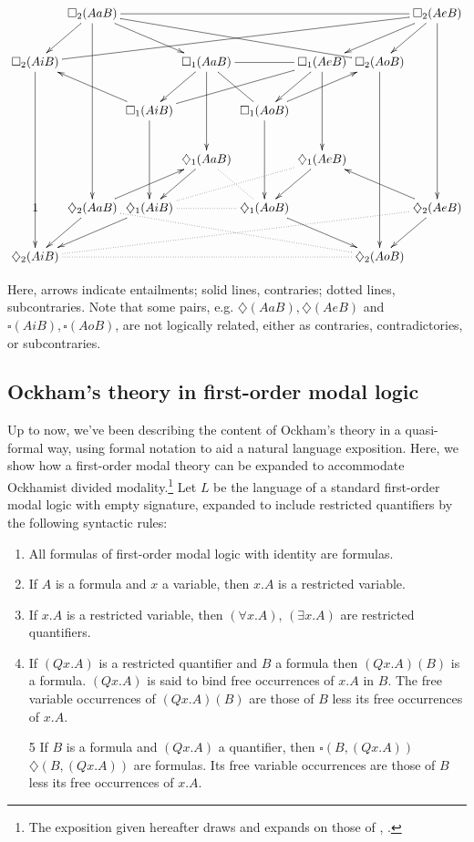 	\begin{displaymath}
	\xymatrix@C=.1em{
		& \square_{2}(AaB) \ar[dddd] \ar[drr] \ar [dl] \ar@{-}[rrrrrr] \ar@{-}[drrrrr] &  &  &  &  &  & \square_{2}(AeB) \ar[dddd] \ar[dl] \ar[dll]\\
		\square_{2}(AiB) \ar[dddd] \ar@{-}[urrrrrrr] &  &  & \square_{1}(AaB) \ar[dd] \ar[dl] \ar@{-}[rr] \ar@{-}[dr]
		&  & \square_{1}(AeB) \ar[dd] \ar[dl] \ar@{-}[dlll] & \square_{2}(AoB) \ar[dddd] &  \\
		&  & \square_{1}(AiB) \ar[dd] \ar[ull] &  & \square_{1}(AoB) \ar[dd] \ar[urr] &  &  &  \\
		&  &  & \diamondsuit_{1}(AaB) \ar[dl] \ar@{.}[dr] &  & \diamondsuit_{1}(AeB) \ar[dl] &  &  \\ 
		1 & \diamondsuit_{2}(AaB) \ar[dl] \ar[urr] \ar@{.}[drrrrr] & \diamondsuit_{1}(AiB) \ar[dll] \ar@{.}[rr] \ar@{.}[rrru]& & \diamondsuit_{1}(AoB) \ar[drr] &  &  & \diamondsuit_{2}(AeB) \ar[ull] \ar[dl] \\
		\diamondsuit_{2}(AiB) \ar@{.}[rrrrrr] \ar@{.}[rrrrrrru] &  &  &  &  &  & \diamondsuit_{2}(AoB) & }
	\end{displaymath}
	
	Here, arrows indicate entailments; solid lines, contraries; dotted lines, subcontraries. Note that some pairs, e.g. $\diamondsuit(AaB), \diamondsuit(AeB)$ and $\square(AiB), \square(AoB)$, are not logically related, either as contraries, contradictories, or subcontraries.
	\subsection{Ockham's theory in first-order modal logic}
	Up to now, we've been describing the content of Ockham's theory in a quasi-formal way, using formal notation to aid a natural language exposition. Here, we show how a first-order modal theory can be expanded to accommodate Ockhamist divided modality.\footnote{The exposition given hereafter draws and expands on those of \cite{Klima1988}, \cite{Klima2001}.} Let $L$ be the language of a standard first-order modal logic with empty signature, expanded to include restricted quantifiers by the following syntactic rules: 
	\begin{enumerate}
		\item All formulas of first-order modal logic with identity are formulas.
		\item If $A$ is a formula and $x$ a variable, then $x.A$ is a restricted variable. 
		\item If $x.A$ is a restricted variable, then $(\forall x.A)$, $(\exists x.A)$ are restricted quantifiers. 
		\item If $(Qx.A)$ is a restricted quantifier and $B$ a formula then $(Qx.A)(B)$ is a formula. $(Qx.A)$ is said to bind free occurrences of $x.A$ in $B$. The free variable occurrences of $(Qx.A)(B)$ are those of $B$ less its free occurrences of $x.A$.
		\item[5] If $B$ is a formula and $(Qx.A)$ a quantifier, then $\square(B, (Qx.A))$ $\diamondsuit(B, (Qx.A))$ are formulas. Its free variable occurrences are those of $B$ less its free occurrences of $x.A$.
	\end{enumerate}
	
